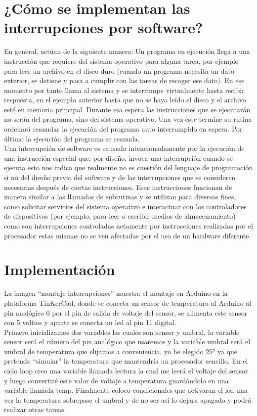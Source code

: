 \documentclass{article}
\begin{document}
\section*{¿Cómo se implementan las interrupciones por software?}

En general, actúan de la siguiente manera: Un programa en ejecución llega a una instrucción que requiere del sistema operativo para alguna tarea, por ejemplo para leer un archivo en el disco duro (cuando un programa necesita un dato exterior, se detiene y pasa a cumplir con las tareas de recoger ese dato). En ese momento por tanto llama al sistema y se interrumpe virtualmente hasta recibir respuesta, en el ejemplo anterior hasta que no se haya leído el disco y el archivo esté en memoria principal. Durante esa espera las instrucciones que se ejecutarán no serán del programa, sino del sistema operativo. Una vez éste termine su rutina ordenará reanudar la ejecución del programa auto interrumpido en espera. Por último la ejecución del programa se reanuda.\\

Una interrupción de software es causada intencionadamente por la ejecución de una instrucción especial que, por diseño, invoca una interrupción cuando se ejecuta esto nos indica que realmente no es cuestión del lenguaje de programación si no del diseño previo del software y de las interrupciones que se consideren necesarias después de ciertas instrucciones. Esas instrucciones funcionan de manera similar a las llamadas de subrutinas y se utilizan para diversos fines, como solicitar servicios del sistema operativo e interactuar con los controladores de dispositivos (por ejemplo, para leer o escribir medios de almacenamiento) como son interrupciones controladas netamente por instrucciones realizadas por el procesador estas mismas no se ven afectadas por el uso de un hardware diferente.


\section*{Implementación}

La imagen “montaje interrupciones” muestra el montaje en Arduino en la plataforma TinKerCad, donde se conecta un sensor de temperatura al Arduino al pin analógico 0 por el pin de salida de voltaje del sensor, se alimenta este sensor con 5 voltios y aparte se conecta un led al pin 11 digital.\\
Primero inicializamos dos variables las cuales son sensor y umbral, la variable sensor será el número del pin analógico que usaremos y la variable umbral será el umbral de temperatura que elijamos a conveniencia, yo he elegido 25° ya que pretendo “simular” la temperatura que mantendría un procesador sencillo. 
En el ciclo loop creo una variable llamada lectura la cual me leerá el voltaje del sensor y luego convertiré este valor de voltaje a temperatura guardándolo en una variable llamada temp. 
Finalmente coloco condicionales que activaran el led una vez la temperatura sobrepase el umbral y de no ser así lo dejara apagado y podrá realizar otras tareas.
\end{document}
